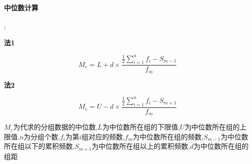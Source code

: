 \documentclass[
]{article}
\begin{document}
\paragraph{中位数计算}:

\textbf{法1}

\[
 M_e = L + d \times \frac{\frac{1}{2} \sum\limits_{i=1}^{n}f_i - S_{m - 1}}{f_m}
\]

\textbf{法2}

\[
 M_e = U - d \times \frac{\frac{1}{2} \sum\limits_{i=1}^{n}f_i - S_{m + 1}}{f_m}
\]

\(M_e\)为代求的分组数据的中位数,\(L\)为中位数所在组的下限值,\(U\)为中位数所在组的上限值,\(n\)为分组个数,\(f_i\)为第\(i\)组对应的频数,\(f_m\)为中位数所在组的频数,\(S_{m-1}\)为中位数所在组以下的累积频数,\(S_{m+1}\)为中位数所在组以上的累积频数,\(d\)为中位数所在组的组距
\end{document}
